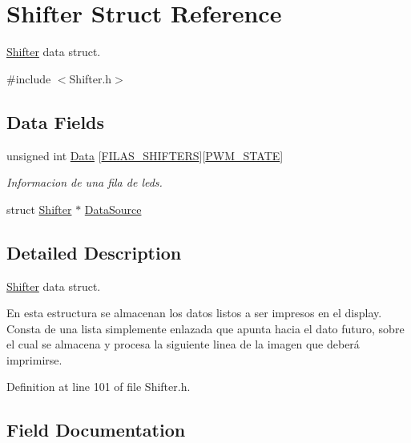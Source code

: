 \hypertarget{structShifter}{}\section{Shifter Struct Reference}
\label{structShifter}


\mbox{\hyperlink{structShifter}{Shifter}} data struct.  




{\ttfamily \#include $<$Shifter.\+h$>$}

\subsection*{Data Fields}
\begin{DoxyCompactItemize}
\item 
unsigned int \mbox{\hyperlink{structShifter_a815b5530bcfa9d222f76fd2033f47afa}{Data}} \mbox{[}\mbox{\hyperlink{Shifter_8h_a49e09f75d58a782c6d7f7e2def2611ae}{F\+I\+L\+A\+S\+\_\+\+S\+H\+I\+F\+T\+E\+RS}}\mbox{]}\mbox{[}\mbox{\hyperlink{Shifter_8h_a980e4269a1af42f44334612038718c32}{P\+W\+M\+\_\+\+S\+T\+A\+TE}}\mbox{]}
\begin{DoxyCompactList}\small\item\em Informacion de una fila de leds. \end{DoxyCompactList}\item 
struct \mbox{\hyperlink{structShifter}{Shifter}} $\ast$ \mbox{\hyperlink{structShifter_a7c2c0de3d2c63e31863ed44845d63ba8}{Data\+Source}}
\end{DoxyCompactItemize}


\subsection{Detailed Description}
\mbox{\hyperlink{structShifter}{Shifter}} data struct. 

En esta estructura se almacenan los datos listos a ser impresos en el display. Consta de una lista simplemente enlazada que apunta hacia el dato futuro, sobre el cual se almacena y procesa la siguiente linea de la imagen que deberá imprimirse. 

Definition at line 101 of file Shifter.\+h.



\subsection{Field Documentation}
\mbox{\label{structShifter_a815b5530bcfa9d222f76fd2033f47afa}} 
